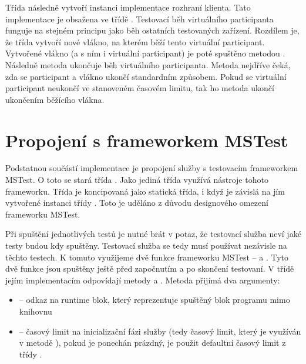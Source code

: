 Třída následně vytvoří instanci implementace rozhraní klienta. Tato implementace je obsažena ve třídě . Testovací běh virtuálního participanta funguje na stejném principu jako běh ostatních testovaných zařízení. Rozdílem je, že třída  vytvoří nové vlákno, na kterém běží tento virtuální participant. Vytvořené vlákno (a s ním i virtuální participant) je poté spuštěno metodou . Následně metoda  ukončuje běh virtuálního participanta. Metoda nejdříve čeká, zda se participant a vlákno ukončí standardním způsobem. Pokud se virtuální participant neukončí ve stanoveném časovém limitu, tak ho metoda ukončí ukončením běžícího vlákna.

\section{Propojení s frameworkem MSTest}

Podstatnou součástí implementace je propojení služby s testovacím frameworkem MSTest. O toto se stará třída . Jako jediná třída využívá nástroje tohoto frameworku. Třída je koncipovaná jako statická třída, i když je závislá na jím vytvořené instanci třídy . Toto je uděláno z důvodu designového omezení frameworku MSTest. 

Při spuštění jednotlivých testů je nutné brát v potaz, že testovací služba neví jaké testy budou kdy spuštěny. Testovací služba se tedy musí používat nezávisle na těchto testech. K tomuto využijeme dvě funkce frameworku MSTest --  a . Tyto dvě funkce jsou spuštěny ještě před započnutím a po skončení testovaní. V třídě  jejím implementacím odpovídají metody  a . Metoda  přijímá dva argumenty:

\begin{itemize}
    \item {} -- odkaz na runtime blok, který reprezentuje spuštěný blok programu mimo knihovnu
    \item {} -- časový limit na inicializační fázi služby (tedy časový limit, který je využíván v metodě ), pokud je ponechán prázdný, je použit defaultní časový limit z třídy .
\end{itemize}

